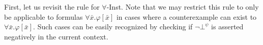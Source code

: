 \documentclass{llncs}
\newtheorem{thm}{Theorem}
\begin{document}
First, let us revisit the rule for $\forall$-Inst.
Note that we may restrict this rule to only be applicable to formulas $\forall \bar{x}. \varphi[ \bar{ x } ]$ in cases where a counterexample can exist to $\forall \bar{x}. \varphi[ \bar{ x } ]$.
Such cases can be easily recognized by checking if $\neg \bot^\psi$ is asserted negatively in the current context.

\begin{comment}
Such cases can be easily recognized due to the following theorem:

\begin{thm}
For all DPLL(T) states of the form $M, \neg \bot^\psi \parallel F$, if no literal $l \mapsto^I \psi$ is asserted as a decision in $M$, then $M \models_T \psi[\bar{t}/\bar{x}]$ for all $\bar{t}$, or in other words, $\psi$ is valid in the context $M$.
\end{thm}
\begin{proof}
Assume we have a DPLL(T) state $M, \neg \bot^\psi \parallel F$, where $\neg \bot^\psi$ is asserted as a non-decision literal.

Consider the case where $\neg \bot^\psi$ was asserted by unit-propagation.
Since $\psi$ is in $M$, by Invariant 1, it must be the case that $M \models \psi[\bar{e}/\bar{x}]$.
Since no literal $l \mapsto^I \psi$ is asserted as a decision in $M$, we can construct an explanation $N \subseteq M$ such that $N \models \psi[\bar{e}/\bar{x}]$ and $N$ does not contain $\bar{e}$.
Since $\bar{e}$ do not occur in $N$, we have $N \models \psi[\bar{t}/\bar{x}]$ for all vectors of terms $\bar{t}$, and therefore $M \models \psi[\bar{t}/\bar{x}]$ as well.

Consider the case where $\neg \bot^\psi$ was asserted due to a backjump.
The reasoning here is similar, where now a conflict was discovered for a clause of the form $( \neg \psi \vee \neg \bot^\psi \vee l_1[\bar{e}] \vee \ldots \vee l_n[\bar{e}])$, where $\neg l_1[\bar{e}] \wedge \ldots \wedge \neg l_n[\bar{e}] \Rightarrow \psi$.
If no literal $l \mapsto^I \psi$ is asserted as a decision literal in $M$, we construct an explanation as before to show $\psi$ is valid in $M$.
$\Box$
\end{proof}

Accordingly, we wish to use a search strategy in which no literal $l \mapsto^I \psi$ should be asserted as a decision when $\neg \bot^\psi$ is not asserted.
This scheme may be enforced within the core of the SAT solver when chosing a decision literal.
When the SAT solver decides on a literal $l \mapsto^I \psi$, it checks if a value has been given to $\neg \bot^\psi$.
If it has not, then it chooses another literal to decide upon.
This is discussed in more detail in Section~\ref{sec:sat-add}.
\end{comment}
\end{document}
